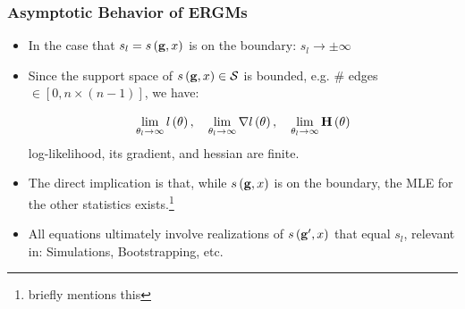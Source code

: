 \documentclass[aspectratio=169, 9pt, handout]{beamer}
\begin{document}
\begin{frame}[label=discrete-exponential-theory]
	\frametitle{Asymptotic Behavior of ERGMs}
	
	\begin{itemize}
		\item In the case that $s_l = s\left(\mathbf{g}, x\right)$ is on the boundary: $s_l \to \pm\infty$\pause
		\item Since the support space of $s\left(\mathbf{g}, x\right)\in\mathcal{S}$ is bounded, e.g. \# edges $\in [0,n\times (n - 1)]$, we have: \pause
		
		\begin{equation*}
		\lim_{\theta_l\to\infty}\loglik{\theta}, \quad %
		\lim_{\theta_l\to\infty}\nabla\loglik{\theta}, \quad %
		\lim_{\theta_l\to\infty}\mathbf{H}\left(\theta\right)
		\end{equation*}
		log-likelihood, its gradient, and hessian are finite.\pause
		\item The direct implication is that, while $s\left(\mathbf{g}, x\right)$ is on the boundary, the MLE for the other statistics exists.\footnote{\cite{Handcock2003} briefly mentions this}\pause
		\item All equations ultimately involve realizations of $s\left(\mathbf{g}', x\right)$ that equal $s_l$, relevant in: Simulations, Bootstrapping, etc.
	\end{itemize}
	
	\vfill\hfill\hyperlink{discrete-exponential}{}
	
\end{frame}
\end{document}
